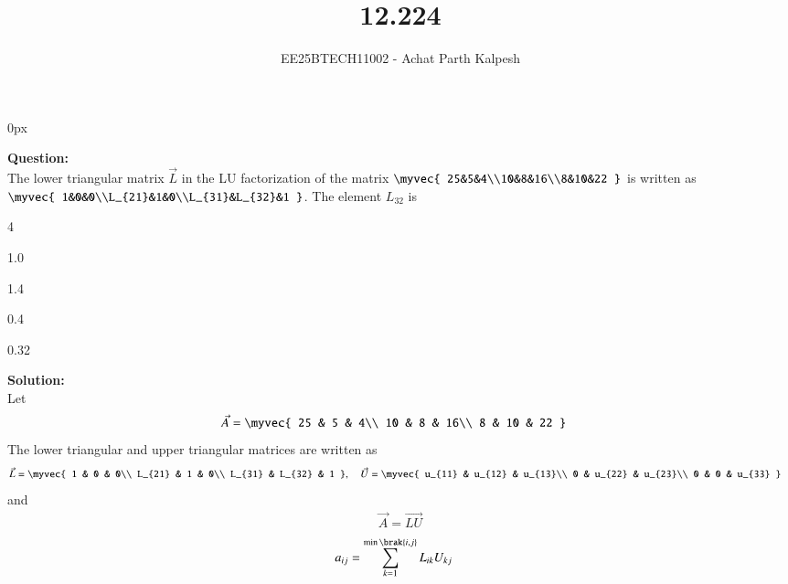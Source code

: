 \documentclass[journal]{IEEEtran}
\begin{document}

\title{12.224}
\author{EE25BTECH11002 - Achat Parth Kalpesh }
{\let\newpage\relax\maketitle}
\renewcommand{\thefigure}{\theenumi}
\renewcommand{\thetable}{\theenumi}
\setlength{\intextsep}{10pt} %
\renewcommand{\thetable}{\theenumi}
\parindent 0px



\textbf{Question:}\\
The lower triangular matrix $\vec{L}$ in the LU factorization of the matrix
$\myvec{
    25&5&4\\10&8&16\\8&10&22
}$ is written as $\myvec{
    1&0&0\\L_{21}&1&0\\L_{31}&L_{32}&1
}$. The element $L_{32}$ is 
\begin{enumerate}
\begin{multicols}{4}
\item 1.0 
\item 1.4 
\item 0.4 
\item 0.32
\end{multicols}
\end{enumerate}
\textbf{Solution:}\\
Let 
\begin{align}
    \vec{A} &= \myvec{
        25 & 5 & 4\\
        10 & 8 & 16\\
        8 & 10 & 22
    }
\end{align}
The lower triangular and upper triangular matrices are written as
\begin{align}
    \vec{L} &= \myvec{
        1 & 0 & 0\\
        L_{21} & 1 & 0\\
        L_{31} & L_{32} & 1
    }, \quad
    \vec{U} = \myvec{
        u_{11} & u_{12} & u_{13}\\
        0 & u_{22} & u_{23}\\
        0 & 0 & u_{33}
    }
\end{align}
and
\begin{align}
    \vec{A} = \vec{LU}
\end{align}
\begin{align}
    a_{ij} &= \sum_{k=1}^{\min\brak{i,j}} L_{ik}U_{kj}
\end{align}
\end{document}
